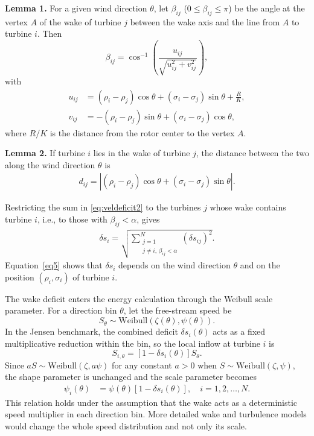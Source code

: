 \documentclass[journal,twoside]{IEEEtran}
\begin{document}
\textbf{Lemma 1.} For a given wind direction \( \theta \), let \( \beta_{ij} \) (\( 0 \leq \beta_{ij} \leq \pi \)) be the angle at the vertex \( A \) of the wake of turbine \( j \) between the wake axis and the line from \( A \) to turbine \( i \). Then
\[
\beta_{ij} = \cos^{-1}\!\left(\frac{u_{ij}}{\sqrt{u_{ij}^2+v_{ij}^2}}\right),
\]
with
\begin{align*}
u_{ij}&=(\rho_i - \rho_j)\cos\theta + (\sigma_i - \sigma_j)\sin\theta + \tfrac{R}{K},\\
v_{ij}&=-(\rho_i - \rho_j)\sin\theta + (\sigma_i - \sigma_j)\cos\theta ,
\end{align*}
where \( R/K \) is the distance from the rotor center to the vertex \( A \).

\textbf{Lemma 2.} If turbine \( i \) lies in the wake of turbine \( j \), the distance between the two along the wind direction \( \theta \) is
\begin{align*}
d_{ij} = \left| (\rho_i - \rho_j)\cos\theta + (\sigma_i - \sigma_j)\sin\theta \right|.
\end{align*}

Restricting the sum in \eqref{eq:veldeficit2} to the turbines \( j \) whose wake contains turbine \( i \), i.e., to those with \( \beta_{ij} < \alpha \), gives
\begin{align}\label{eq5}
\delta s_i = \sqrt{ \sum_{\substack{j = 1 \\ j \ne i,\, \beta_{ij} < \alpha}}^{N} \left( \delta s_{ij} \right)^2 }.
\end{align}
Equation~\eqref{eq5} shows that \( \delta s_i \) depends on the wind direction \( \theta \) and on the position \( (\rho_i, \sigma_i) \) of turbine \( i \).

The wake deficit enters the energy calculation through the Weibull scale parameter. For a direction bin $\theta$, let the free-stream speed be
\[
S_\theta \sim \mathrm{Weibull}\!\left(\zeta(\theta),\psi(\theta)\right).
\]
In the Jensen benchmark, the combined deficit $\delta s_i(\theta)$ acts as a fixed multiplicative reduction within the bin, so the local inflow at turbine $i$ is
\[
S_{i,\theta}=\left[1-\delta s_i(\theta)\right]S_\theta .
\]
Since $aS\sim\mathrm{Weibull}(\zeta,a\psi)$ for any constant $a>0$ when $S\sim\mathrm{Weibull}(\zeta,\psi)$, the shape parameter is unchanged and the scale parameter becomes
\begin{align}
\psi_i(\theta) &= \psi(\theta)\left[1-\delta s_i(\theta)\right],
\quad i=1,2,\ldots,N. \label{eq:weibull-scale}
\end{align}
This relation holds under the assumption that the wake acts as a deterministic speed multiplier in each direction bin. More detailed wake and turbulence models would change the whole speed distribution and not only its scale.
\end{document}
